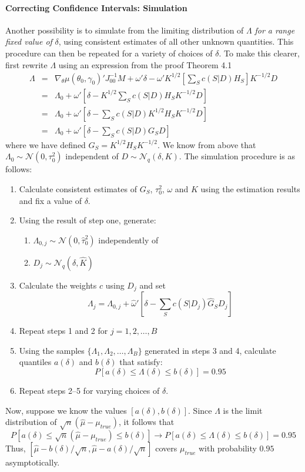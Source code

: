 \paragraph{Correcting Confidence Intervals: Simulation} Another possibility is to simulate from the limiting distribution of $\Lambda$ \emph{for a range fixed value of} $\delta$, using consistent estimates of all other unknown quantities. This procedure can then be repeated for a variety of choices of $\delta$. To make this clearer, first rewrite $\Lambda$ using an expression from the proof Theorem 4.1
	\begin{eqnarray*}
		\Lambda &=&\nabla_{\theta}\mu(\theta_0, \gamma_0)'J_{00}^{-1}M+  \omega'\delta - \omega 'K^{1/2}\left[ \sum_S c(S|D)H_S\right] K^{-1/2}D \\
			&=& \Lambda_0 + \omega' \left[ \delta - K^{1/2} \sum_S c(S|D)H_S K^{-1/2}D \right]\\
			&=& \Lambda_0 + \omega' \left[ \delta - \sum_S c(S|D)K^{1/2} H_S K^{-1/2}D \right]\\
			&=& \Lambda_0 + \omega' \left[ \delta - \sum_S c(S|D)G_S D \right]
	\end{eqnarray*}
where we have defined $G_S = K^{1/2} H_S K^{-1/2}$. We know from above  that $\Lambda_0 \sim \mathcal{N}(0,\tau_0^2)$ independent of $D\sim \mathcal{N}_q(\delta,K)$. The simulation procedure is as follows:
		\begin{enumerate}
			\item Calculate consistent estimates of $G_S$, $\tau_0^2$, $\omega$ and $K$ using the estimation results and fix a value of $\delta$.
			\item Using the result of step one, generate:
				\begin{enumerate}
					\item $\Lambda_{0,j}\sim\mathcal{N}(0, \hat{\tau}^{2}_0)$ independently of
					\item  $D_j \sim \mathcal{N}_q(\delta, \hat{K})$
				\end{enumerate}
			\item Calculate the weights $c$ using $D_j$ and set 
				$$\Lambda_j = \Lambda_{0,j} + \hat{\omega}' \left[ \delta - \sum_S c(S|D_j)\hat{G}_S D_j \right]$$
		\item Repeat steps 1 and 2 for $j= 1, 2, \hdots, B$
		\item Using the samples $\{\Lambda_1, \Lambda_2, \hdots, \Lambda_B\}$ generated in steps 3 and 4, calculate quantiles $a(\delta)$ and $b(\delta)$ that satisfy:
			$$P\left[ a(\delta) \leq \Lambda(\delta) \leq b(\delta) \right]= 0.95$$
		\item Repeat steps 2--5 for varying choices of $\delta$.
		\end{enumerate}
Now, suppose we know the values $[a(\delta), b(\delta)]$. Since $\Lambda$ is the limit distribution of $\sqrt{n}(\hat{\mu} - \mu_{true})$, it follows that
	$$P\left[a(\delta)\leq \sqrt{n}(\hat{\mu} - \mu_{true}) \leq b(\delta)  \right]\rightarrow P\left[a(\delta)\leq \Lambda(\delta) \leq b(\delta)  \right] = 0.95$$
Thus, $\left[\hat{\mu} - b(\delta)/\sqrt{n}, \hat{\mu} - a(\delta)/\sqrt{n}  \right]$ covers $\mu_{true}$ with probability $0.95$ asymptotically.

